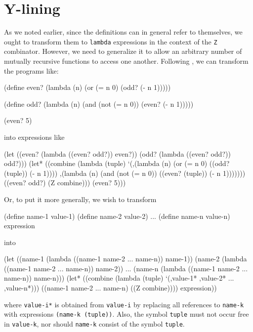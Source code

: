 \chapter{Y-lining} \label{Y-lining}

As we noted earlier, since the definitions can in general refer
to themselves, we ought to transform them to \texttt{lambda}
expressions in the context of the \texttt{Z} combinator.
However, we need to generalize it to allow an arbitrary
number of mutually recursive functions to access one another.
Following \cite{Harrison1997}, we can transform the programs
like:

\begin{Snippet}
  (define even? (lambda (n)
                  (or (= n 0)
                      (odd? (- n 1)))))

  (define odd? (lambda (n)
                 (and (not (= n 0))
                      (even? (- n 1)))))

  (even? 5)
\end{Snippet}
into expressions like
\begin{Snippet}
  (let ((even? (lambda ((even? odd?)) even?))
        (odd? (lambda ((even? odd?)) odd?)))
    (let* ((combine (lambda (tuple)
                      `(,(lambda (n)
                          (or (= n 0)
                              ((odd? (tuple)) (- n 1))))
                        ,(lambda (n)
                          (and (not (= n 0))
                               ((even? (tuple)) (- n 1)))))))
           ((even? odd?) (Z combine)))
      (even? 5)))
\end{Snippet}

Or, to put it more generally, we wish to transform

\begin{Snippet}
  (define name-1 value-1)
  (define name-2 value-2)
  ...
  (define name-n value-n)
  expression
\end{Snippet}

into

\begin{Snippet}
  (let ((name-1 (lambda ((name-1 name-2 ... name-n)) name-1))
        (name-2 (lambda ((name-1 name-2 ... name-n)) name-2))
         ...
        (name-n (lambda ((name-1 name-2 ... name-n)) name-n)))
    (let* ((combine (lambda (tuple)
                      `(,value-1* ,value-2* ... ,value-n*)))
           ((name-1 name-2 ... name-n) ((Z combine))))
      expression))
\end{Snippet}

where \texttt{value-i*} is obtained from \texttt{value-i} by
replacing all references to \texttt{name-k} with expressions
\texttt{(name-k (tuple))}. Also, the symbol \texttt{tuple}
must not occur free in \texttt{value-k}, nor should
\texttt{name-k} consist of the symbol \texttt{tuple}.

